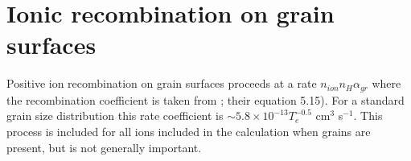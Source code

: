 \section{Ionic recombination on grain surfaces}

Positive ion recombination on grain surfaces proceeds at a rate
$n_{ion}n_H\alpha_{gr}$
where the recombination coefficient is taken from \citet{Draine1987};
their equation 5.15).  For a standard grain size distribution this rate
coefficient is $\sim 5.8\times 10^{-13}T_e^{-0.5}$ cm$^3$ s$^{-1}$.  This process is included for
all ions included in the calculation when grains are present, but is not
generally important.
